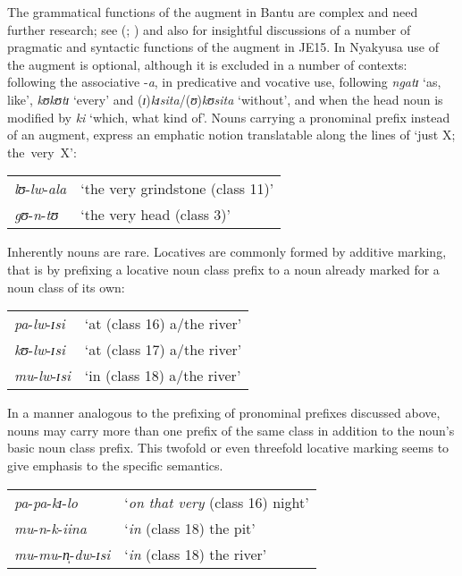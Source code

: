 The grammatical functions of the augment in Bantu are complex and need further research; see \citeauthor{HymanLKatambaF1991} (\citeyear{HymanLKatambaF1991}; \citeyear{HymanLKatambaF1993}) and also \citet{VanDerWalJNamyaloS2015} for insightful discussions of a number of pragmatic and syntactic functions of the augment in  JE15. In Nyakyusa use of the augment is optional, although it is excluded in a number of contexts: following the associative -\textit{a}, in predicative and vocative use, following \textit{ngatɪ} `as, like', \textit{kʊkʊtɪ} `every' and (\textit{ɪ})\textit{kɪsita}/(\textit{ʊ})\textit{kʊsita} \lq without', and when the head noun is modified by \textit{ki} `which, what kind of'. Nouns carrying a pronominal prefix instead of an augment, express an emphatic notion translatable along the lines of `just X; \mbox{the very X}':

\begin{exe}
	\ex\begin{tabular}[t]{ll}
		\textit{lʊ}-\textit{lw}-\textit{ala} & `the very grindstone (class 11)'\\
		\textit{gʊ}-\textit{n}-\textit{tʊ} & `the very head (class 3)'\\
	\end{tabular}
\end{exe}

Inherently  nouns are rare. Locatives are commonly formed by additive marking, that is by prefixing a locative noun class prefix to a noun already marked for a noun class of its own:
\begin{exe}
	\ex \label{exLocativeNouns}
	\begin{tabular}[t]{ll}
		\textit{pa}-\textit{lw}-\textit{ɪsi} & `at (class 16) a/the river'\\
		\textit{kʊ}-\textit{lw}-\textit{ɪsi} & `at (class 17) a/the river'\\
		\textit{mu}-\textit{lw}-\textit{ɪsi} & `in (class 18) a/the river'\\
	\end{tabular}
\end{exe}

In a manner analogous to the prefixing of pronominal prefixes discussed above,  nouns may carry more than one prefix of the same  class in addition to the noun's basic noun class prefix. This twofold or even threefold locative marking seems to give emphasis to the specific  semantics.
\begin{exe}
	\ex
	\begin{tabular}[t]{ll}
		\textit{pa}-\textit{pa}-\textit{kɪ}-\textit{lo} & `\textit{on that very} (class 16) night'
		\\\textit{mu}-\textit{n}-\textit{k}-\textit{iina} &  `\textit{in} (class 18) the pit'
		\\\textit{mu}-\textit{mu}-\textit{n̩}-\textit{dw}-\textit{ɪsi} & \lq \textit{in} (class 18) the river'
	\end{tabular}
\end{exe}

